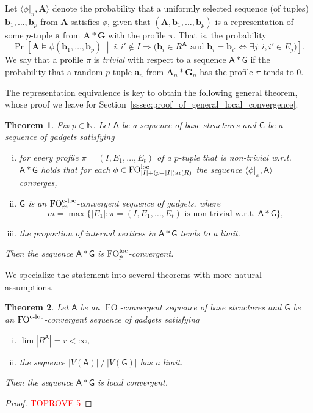 \documentclass[11pt]{article}
\theoremstyle{plain}
\newtheorem{theorem}{Theorem}[section]
\theoremstyle{definition}
\theoremstyle{remark}
\DeclareMathOperator\aritysym{ar}
\newcommand{\arity}[1]{{\aritysym({#1})}}
\newcommand{\N}{\mathbb{N}}
\DeclareMathOperator\FO{FO}
\newcommand{\FOloc}[1]{\FO_{#1}^\textnormal{loc}}
\newcommand{\FOcloc}[1]{\FO_{#1}^{\textnormal{c-loc}}}
\newcommand{\stonepar}[2]{\langle #1, #2 \rangle}
\newcommand{\str}[1]{\mathbf{#1}}
\newcommand{\strseq}[1]{{\boldsymbol{\mathsf{#1}}}}
\newcommand{\tpl}[1]{{\bm{#1}}}
\begin{document}
Let $\stonepar{\phi|_\pi}{\str{A}}$ denote the probability that a uniformly selected sequence (of tuples) $\tpl{b}_1, \dots, \tpl{b}_p$ from $\str{A}$ satisfies $\phi$, given that $(\str{A}, \tpl{b}_1, \dots, \tpl{b}_p)$ is a representation of some $p$-tuple $\tpl{a}$ from $\str{A}*\str{G}$ with the profile $\pi$.
That is, the probability
\[
    \Pr
    \left[
        \str{A} \models \phi(\tpl{b}_1, \dots, \tpl{b}_p) 
        \;\middle|\;
            i,i'\not\in I \Rightarrow             
            \big(
                \tpl{b}_i \in R^\str{A} 
                \text{ and } 
                \tpl{b}_i = \tpl{b}_{i'} \Leftrightarrow \exists j : i,i' \in E_j
            \big)
    \right]
    .
\]
We say that a profile $\pi$ is \emph{trivial} with respect to a sequence $\strseq{A}*\strseq{G}$ if the probability that a random $p$-tuple $\tpl{a}_n$ from $\str{A}_n*\str{G}_n$ has the profile $\pi$ tends to $0$.

The representation equivalence is key to obtain the following general theorem, whose proof we leave for Section~\ref{sssec:proof_of_general_local_convergence}.

\begin{theorem}\label{thm:general_local_convergence}
    Fix $p \in \N$.
    Let $\strseq{A}$ be a sequence of base structures and $\strseq{G}$ be a sequence of gadgets satisfying
    \begin{enumerate}[(i)]
        \item for every profile $\pi = (I,E_1, \dots, E_t)$ of a $p$-tuple that is non-trivial w.r.t. $\strseq{A}*\strseq{G}$ holds that for each $\phi \in \FOloc{|I|+(p-|I|)\arity{R}}$ the sequence $\stonepar{\phi|_\pi}{\strseq{A}}$ converges,
        \item $\strseq{G}$ is an $\FOcloc{m}$-convergent sequence of gadgets, where
        \[
            m = \max \{ |E_1| : \pi = (I,E_1, \dots, E_t) \text{ is non-trivial w.r.t. } \strseq{A}*\strseq{G} \}
            ,
        \]
        \item the proportion of internal vertices in $\strseq{A}*\strseq{G}$ tends to a limit.
    \end{enumerate}
    Then the sequence $\strseq{A}*\strseq{G}$ is $\FOloc{p}$-convergent.
\end{theorem}

We specialize the statement into several theorems with more natural assumptions.

\begin{theorem}\label{thm:fo_finitely_many_r_edges}
    Let $\strseq{A}$ be an $\FO$-convergent sequence of base structures and $\strseq{G}$ be an $\FOcloc{}$-convergent sequence of gadgets satisfying
    \begin{enumerate}[(i)]
         \item $\lim |R^\strseq{A}| = r < \infty$,
         \item the sequence $|V(\strseq{A})|\:/\:|V(\strseq{G})|$ has a limit.
    \end{enumerate}
    Then the sequence $\strseq{A}*\strseq{G}$ is local convergent.
\end{theorem}
\begin{proof}\textcolor{red}{TOPROVE 5}\end{proof}
\end{document}
